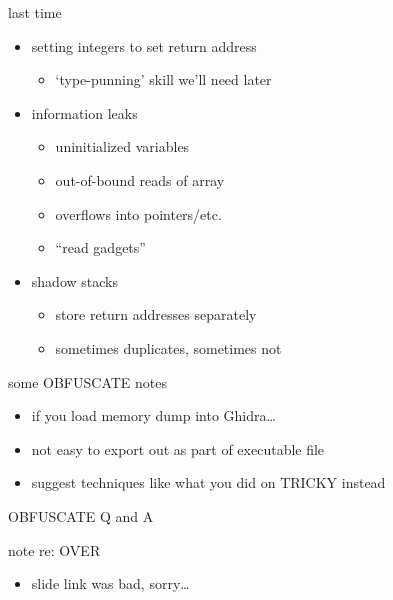 \date{}
\title{}
\date{}

\begin{frame}
    \titlepage
\end{frame}



\begin{frame}{last time}
    \begin{itemize}
    \item setting integers to set return address
        \begin{itemize}
        \item `type-punning' skill we'll need later
        \end{itemize}
    \item information leaks
        \begin{itemize}
        \item uninitialized variables
        \item out-of-bound reads of array
        \item overflows into pointers/etc. 
        \item ``read gadgets''
        \end{itemize}
    \item shadow stacks
        \begin{itemize}
        \item store return addresses separately
        \item sometimes duplicates, sometimes not
        \end{itemize}
    \end{itemize}
\end{frame}

\begin{frame}{some OBFUSCATE notes}
    \begin{itemize}
    \item if you load memory dump into Ghidra\ldots
    \item not easy to export out as part of executable file
    \vspace{.5cm}
    \item suggest techniques like what you did on TRICKY instead
    \end{itemize}
\end{frame}

\begin{frame}{OBFUSCATE Q and A}
\end{frame}

\begin{frame}{note re: OVER}
    \begin{itemize}
    \item slide link was bad, sorry\ldots
    \end{itemize}
\end{frame}

